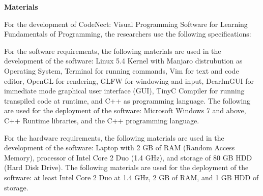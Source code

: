 \flushleft
\textbf{Materials}\\
\justifying

\parx
For the development of CodeNect: Visual Programming Software for Learning
Fundamentals of Programming, the researchers use the following specifications:

\parx
For the software requirements, the following materials are used in the
development of the software: Linux 5.4 Kernel with Manjaro distrubution as
Operating System, Terminal for running commands, Vim for text and code editor,
OpenGL for rendering, GLFW for windowing and input, DearImGUI for immediate
mode graphical user interface (GUI), TinyC Compiler for running transpiled code
at runtime, and C++ as programming language. The following are used for the
deployment of the software: Microsoft Windows 7 and above, C++ Runtime
libraries, and the C++ programming language.

\parx
For the hardware requirements, the following materials are used in the
development of the software: Laptop with 2 GB of RAM (Random Access Memory),
processor of Intel Core 2 Duo (1.4 GHz), and storage of 80 GB HDD (Hard Disk
Drive). The following materials are used for the deployment of the software: at
least Intel Core 2 Duo at 1.4 GHz, 2 GB of RAM, and 1 GB HDD of storage.
